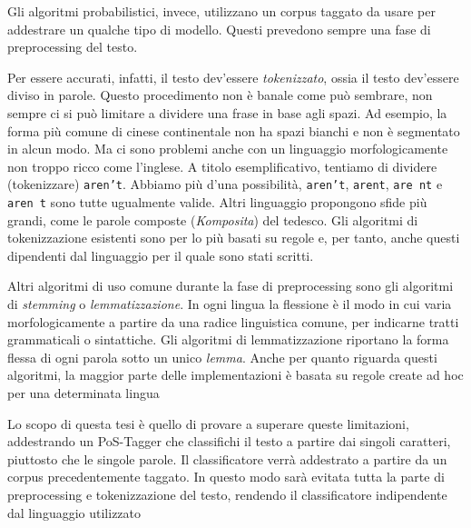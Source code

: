Gli algoritmi probabilistici, invece, utilizzano un corpus taggato da usare per addestrare un qualche tipo di modello.
Questi prevedono sempre una fase di preprocessing del testo.

Per essere accurati, infatti, il testo dev'essere \emph{tokenizzato}, ossia il testo dev'essere diviso in parole.
Questo procedimento non \`e banale come pu\`o sembrare, non sempre ci si pu\`o limitare a dividere una frase in base agli spazi.
Ad esempio, la forma pi\`u comune di cinese continentale non ha spazi bianchi e non \`e segmentato in alcun modo.
Ma ci sono problemi anche con un linguaggio morfologicamente non troppo ricco come l'inglese.
A titolo esemplificativo, tentiamo di dividere (tokenizzare) \texttt{aren't}.
Abbiamo pi\`u d'una possibilit\`a, \texttt{aren't}, \texttt{arent}, \texttt{are nt} e \texttt{aren t} sono tutte ugualmente valide.
Altri linguaggio propongono sfide pi\`u grandi, come le parole composte (\emph{Komposita}) del tedesco.
Gli algoritmi di tokenizzazione esistenti sono per lo pi\`u basati su regole e, per tanto, anche questi dipendenti dal linguaggio per il quale sono stati scritti.

Altri algoritmi di uso comune durante la fase di preprocessing sono gli algoritmi di \emph{stemming} o \emph{lemmatizzazione}.
In ogni lingua la flessione \`e il modo in cui varia morfologicamente a partire da una radice linguistica comune, per indicarne tratti grammaticali o sintattiche.
Gli algoritmi di lemmatizzazione riportano la forma flessa di ogni parola sotto un unico \emph{lemma}.
Anche per quanto riguarda questi algoritmi, la maggior parte delle implementazioni \`e basata su regole create ad hoc per una determinata lingua

Lo scopo di questa tesi \`e quello di provare a superare queste limitazioni, addestrando un PoS-Tagger che classifichi il testo a partire dai singoli caratteri, piuttosto che le singole parole.
Il classificatore verr\`a addestrato a partire da un corpus precedentemente taggato.
In questo modo sar\`a evitata tutta la parte di preprocessing e tokenizzazione del testo, rendendo il classificatore indipendente dal linguaggio utilizzato
